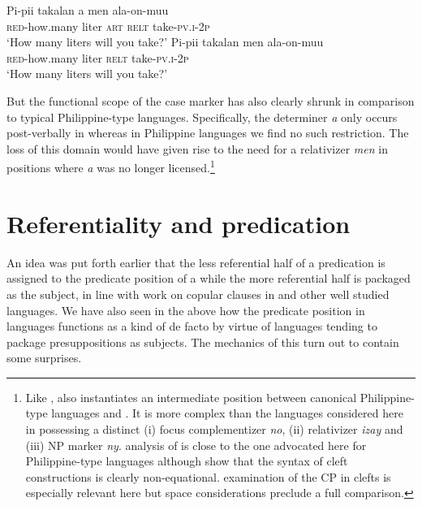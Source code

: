 \documentclass[output=paper]{langsci/langscibook}
\begin{document}
\begin{exe}
	\ex\label{e:kaufman:57}
	\begin{xlist}
		\ex\label{e:kaufman:57a}
        \gll Pi-pii takalan a {\USOParen}men{\USCParen} ala-on-muu{\USQMark}\\
		\textsc{red}-how.many liter \textsc{art} \textsc{relt} take-\textsc{pv.i-2p}\\
		\glt `How many liters will you take?' 
		\ex\label{e:kaufman:57b}
        \gll {\USStar}Pi-pii takalan {\USOParen}men{\USCParen} ala-on-muu{\USQMark}\\
		\phantom{*}\textsc{red}-how.many liter \textsc{relt} take-\textsc{pv.i-2p}\\
		\glt `How many liters will you take?' 
	\end{xlist}
\end{exe}

\noindent
But the functional scope of the case marker has also clearly shrunk in comparison to typical Philippine-type languages. Specifically, the  determiner \textit{a} only occurs post-verbally in  whereas in Philippine languages we find no such restriction. The loss of this domain would have given rise to the need for a relativizer \textit{men} in positions where \textit{a} was no longer licensed.\footnote{Like ,  also instantiates an intermediate position between canonical Philippine-type languages and . It is more complex than the languages considered here in possessing a distinct (i) focus complementizer \textit{no}, (ii) relativizer \textit{izay} and (iii) NP marker \textit{ny}.  analysis of  is close to the one advocated here for Philippine-type languages although \citet{Paul:2001, Law:2007, Kalin:2009, Pearson:2009, Potsdam:2006a} show that the syntax of  cleft constructions is clearly non-equational.  examination of the  CP in clefts is especially relevant here but space considerations preclude a full comparison.}

\section{\label{s:kaufman:5}Referentiality and predication}

An idea was put forth earlier that the less referential half of a predication is assigned to the predicate position of a  while the more referential half is packaged as the subject, in line with work on copular clauses in  and other well studied languages. We have also seen in the above how the predicate position in  languages functions as a kind of de facto  by virtue of  languages tending to package presuppositions as subjects. The mechanics of this turn out to contain some surprises. 
\end{document}
